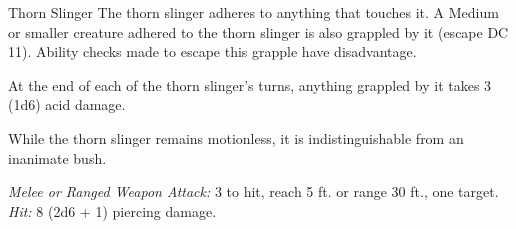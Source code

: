 \documentclass[10pt,a4paper,twoside,bg=print,twocolumn,openany,nodeprecatedcode]{dndbook}
\begin{document}
\begin{DndMonster}[float=t]{Thorn Slinger}
\DndMonsterBasics[
armor-class = {11},
hit-points = {\DndDice{5d10 + 5}},
speed = {10 ft.}
]
\DndMonsterAbilityScores[
 str = 13,
 dex = 12,
 con = 12,
 int = 1,
 wis = 10,
 cha = 1
]
\DndMonsterDetails[
condition-immunities = {blinded, deafened, frightened},
senses = {blindsight 60 ft. (blind beyond this radius), passive perception 10},
challenge = 1/2,
]
The thorn slinger adheres to anything that touches it. A Medium or smaller creature adhered to the thorn slinger is also grappled by it (escape DC 11). Ability checks made to escape this grapple have disadvantage.

At the end of each of the thorn slinger's turns, anything grappled by it takes 3 (1d6) acid damage.

While the thorn slinger remains motionless, it is indistinguishable from an inanimate bush.

\textsl{Melee or Ranged Weapon Attack:} 3 to hit, reach 5 ft. or range 30 ft., one target. \textsl{Hit:} 8 (2d6 + 1) piercing damage.

\end{DndMonster}
\end{document}
